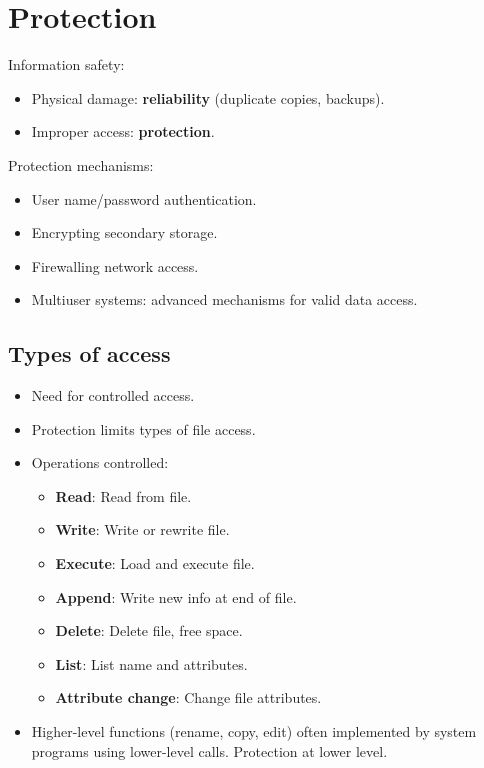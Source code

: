 \section{Protection}

Information safety:
\begin{itemize}
    \item Physical damage: \textbf{reliability} (duplicate copies, backups).
    \item Improper access: \textbf{protection}.
\end{itemize}

Protection mechanisms:
\begin{itemize}
    \item User name/password authentication.
    \item Encrypting secondary storage.
    \item Firewalling network access.
    \item Multiuser systems: advanced mechanisms for valid data access.
\end{itemize}

\subsection{Types of access}
\begin{itemize}
    \item Need for controlled access.
    \item Protection limits types of file access.
    \item Operations controlled:
    \begin{itemize}
        \item \textbf{Read}: Read from file.
        \item \textbf{Write}: Write or rewrite file.
        \item \textbf{Execute}: Load and execute file.
        \item \textbf{Append}: Write new info at end of file.
        \item \textbf{Delete}: Delete file, free space.
        \item \textbf{List}: List name and attributes.
        \item \textbf{Attribute change}: Change file attributes.
    \end{itemize}
    \item Higher-level functions (rename, copy, edit) often implemented by system programs using lower-level calls. Protection at lower level.
\end{itemize}

